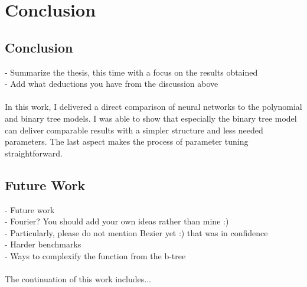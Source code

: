 
\chapter{Conclusion}
\label{ch:conclusions}

\section{Conclusion}
- Summarize the thesis, this time with a focus on the results obtained \\
- Add what deductions you have from the discussion above \\ \\
In this work, I delivered a direct comparison of neural networks to the polynomial and binary tree models. I was able to show that especially the binary tree model can deliver comparable results with a simpler structure and less needed parameters. The last aspect makes the process of parameter tuning straightforward.


\section{Future Work}
- Future work \\
  - Fourier? You should add your own ideas rather than mine :) \\
  - Particularly, please do not mention Bezier yet :) that was in confidence \\
  - Harder benchmarks \\
  - Ways to complexify the function from the b-tree \\ \\
The continuation of this work includes...
